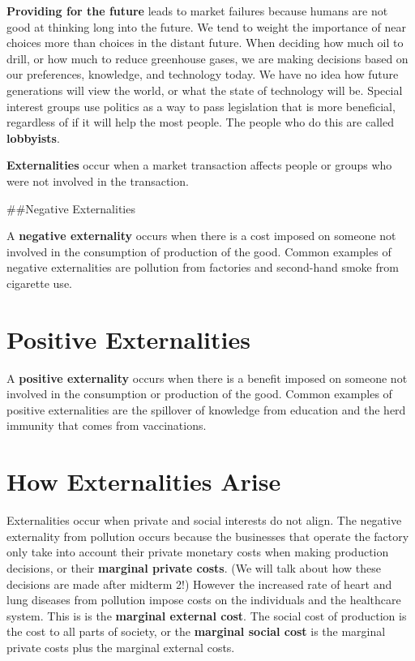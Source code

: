 \documentclass[
]{book}
\begin{document}
\textbf{Providing for the future} leads to market failures because humans are not good at thinking long into the future. We tend to weight the importance of near choices more than choices in the distant future. When deciding how much oil to drill, or how much to reduce greenhouse gases, we are making decisions based on our preferences, knowledge, and technology today. We have no idea how future generations will view the world, or what the state of technology will be.
Special interest groups use politics as a way to pass legislation that is more beneficial, regardless of if it will help the most people. The people who do this are called \textbf{lobbyists}.

\textbf{Externalities} occur when a market transaction affects people or groups who were not involved in the transaction.

\#\#Negative Externalities

A \textbf{negative externality} occurs when there is a cost imposed on someone not involved in the consumption of production of the good. Common examples of negative externalities are pollution from factories and second-hand smoke from cigarette use.

\section{Positive Externalities}\label{positive-externalities}

A \textbf{positive externality} occurs when there is a benefit imposed on someone not involved in the consumption or production of the good. Common examples of positive externalities are the spillover of knowledge from education and the herd immunity that comes from vaccinations.

\section{How Externalities Arise}\label{how-externalities-arise}

Externalities occur when private and social interests do not align. The negative externality from pollution occurs because the businesses that operate the factory only take into account their private monetary costs when making production decisions, or their \textbf{marginal private costs}. (We will talk about how these decisions are made after midterm 2!) However the increased rate of heart and lung diseases from pollution impose costs on the individuals and the healthcare system. This is is the \textbf{marginal external cost}. The social cost of production is the cost to all parts of society, or the \textbf{marginal social cost} is the marginal private costs plus the marginal external costs.
\end{document}
